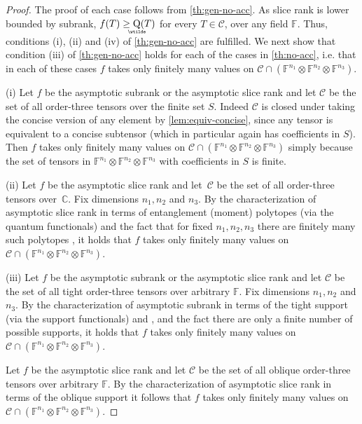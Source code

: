 \documentclass{daj}
\DeclareMathOperator{\asympsubrank}{\underaccent{\wtilde}{Q}}
\newcommand{\FF}{\mathbb{F}}
\newcommand{\CC}{\mathbb{C}}
\begin{document}
\begin{proof}
    The proof of each case follows from \autoref{th:gen-no-acc}. As slice rank is lower bounded by subrank, $f(T) \geq \asympsubrank(T)$ for every $T \in \mathcal{C}$, over any field $\FF$. Thus, conditions (i), (ii) and (iv) of  \autoref{th:gen-no-acc} are fulfilled. We next show that condition (iii) of \autoref{th:gen-no-acc} holds for each of the cases in \autoref{th:no-acc}, i.e. that in each of these cases $f$ takes only finitely many values on $\mathcal{C} \cap (\FF^{n_1} \otimes \FF^{n_2} \otimes \FF^{n_3})$.

    (i) Let $f$ be the asymptotic subrank or the asymptotic slice rank and let $\mathcal{C}$ be the set of all order-three tensors over the finite set $S$. Indeed $\mathcal{C}$ is closed under taking the concise version of any element by \autoref{lem:equiv-concise}, since any tensor is equivalent to a concise subtensor (which in particular again has coefficients in $S$). Then $f$ takes only finitely many values on $\mathcal{C} \cap (\FF^{n_1} \otimes \FF^{n_2} \otimes \FF^{n_3})$ simply because the set of tensors in $\FF^{n_1} \otimes \FF^{n_2} \otimes \FF^{n_3}$ with coefficients in $S$ is finite. 
    
    (ii) Let $f$ be the asymptotic slice rank and let~$\mathcal{C}$ be the set of all order-three tensors over~$\CC$.  Fix dimensions $n_1,n_2$ and $n_3$. By the characterization of asymptotic slice rank in terms of entanglement (moment) polytopes (via the quantum functionals) \cite[Corollary 5.7]{MR4495838} and the fact that for fixed $n_1,n_2,n_3$ there are finitely many such polytopes \cite[Theorem 2]{walter2013entanglement}, it holds that $f$ takes only finitely many values on $\mathcal{C} \cap (\FF^{n_1} \otimes \FF^{n_2} \otimes \FF^{n_3})$. 
    
    (iii) Let $f$ be the asymptotic subrank or the asymptotic slice rank and let $\mathcal{C}$ be the set of all tight order-three tensors over arbitrary $\FF$. Fix dimensions $n_1,n_2$ and $n_3$. By the characterization of asymptotic subrank in terms of the tight support (via the support functionals) \cite[Proposition 5.4]{strassen1991degeneration} and \cite[Theorem 5.9]{MR4495838}, and the fact there are only a finite number of possible supports, it holds that $f$ takes only finitely many values on $\mathcal{C} \cap (\FF^{n_1} \otimes \FF^{n_2} \otimes \FF^{n_3})$.
    

    Let $f$ be the asymptotic slice rank and let $\mathcal{C}$ be the set of all oblique order-three tensors over arbitrary $\FF$. By the characterization of asymptotic slice rank in terms of the oblique support \cite[Proposition 4]{sawin} it follows that $f$ takes only finitely many values on $\mathcal{C} \cap (\FF^{n_1} \otimes \FF^{n_2} \otimes \FF^{n_3})$. 
\end{proof}
\end{document}
